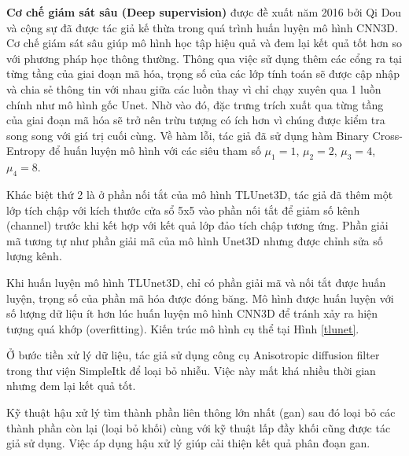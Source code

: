 \textbf{Cơ chế giám sát sâu (Deep supervision)} được đề xuất năm 2016 \cite{Deepsupervision} bởi Qi Dou và cộng sự đã được tác giả kế thừa trong quá trình huấn luyện mô hình CNN3D. Cơ chế giám sát sâu giúp mô hình học tập hiệu quả và đem lại kết quả tốt hơn so với phương pháp học thông thường. Thông qua việc sử dụng thêm các cổng ra tại từng tầng của giai đoạn mã hóa, trọng số của các lớp tính toán sẽ được cập nhập và chia sẻ thông tin với nhau giữa các luồn thay vì chỉ chạy xuyên qua 1 luồn chính như mô hình gốc Unet. Nhờ vào đó, đặc trưng trích xuất qua từng tầng của giai đoạn mã hóa sẽ trở nên trừu tượng có ích hơn vì chúng được kiểm tra song song với giá trị cuối cùng. Về hàm lỗi, tác giả đã sử dụng hàm Binary Cross-Entropy để huấn luyện mô hình với các siêu tham số $\mu_{1} = 1$,  $\mu_{2} = 2$,  $\mu_{3} = 4$,  $\mu_{4} = 8$. 

Khác biệt thứ 2 là ở phần nối tắt của mô hình TLUnet3D, tác giả đã thêm một lớp tích chập với kích thước cửa sổ 5x5 vào phần nối tắt để giảm số kênh (channel) trước khi kết hợp với kết quả lớp đảo tích chập tương ứng. Phần giải mã tương tự như phần giải mã của mô hình Unet3D nhưng được chỉnh sửa số lượng kênh.

Khi huấn luyện mô hình TLUnet3D, chỉ có phần giải mã và nối tắt được huấn luyện, trọng số của phần mã hóa được đóng băng. Mô hình được huấn luyện với số lượng dữ liệu ít hơn lúc huấn luyện mô hình CNN3D để tránh xảy ra hiện tượng quá khớp (overfitting). Kiến trúc mô hình cụ thể tại Hình \ref{tlunet}.

Ở bước tiền xử lý dữ liệu, tác giả sử dụng công cụ Anisotropic diffusion filter trong thư viện SimpleItk để loại bỏ nhiễu. Việc này mất khá nhiều thời gian nhưng đem lại kết quả tốt.

Kỹ thuật hậu xử lý tìm thành phần liên thông lớn nhất (gan) sau đó loại bỏ các thành phần còn lại (loại bỏ khối) cùng với kỹ thuật lấp đầy khối cũng được tác giả sử dụng. Việc áp dụng hậu xử lý giúp cải thiện kết quả phân đoạn gan.

